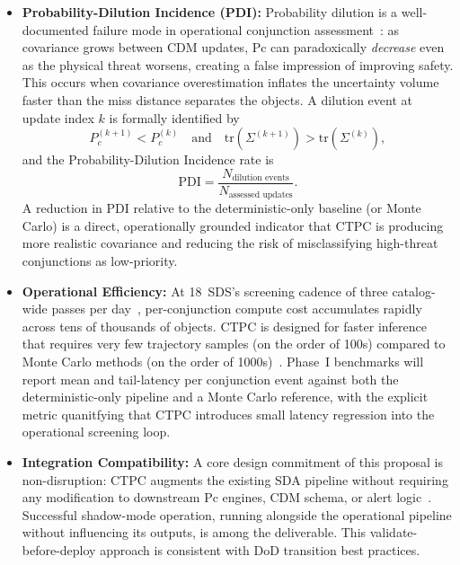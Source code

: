 \documentclass[10pt]{article}
\begin{document}
\begin{itemize}
\item \textbf{Probability-Dilution Incidence (PDI):}\label{itm:pdi}
Probability dilution is a well-documented failure mode in operational conjunction assessment~\cite{nasa_bestpractices}: as covariance grows between CDM updates, Pc can paradoxically \emph{decrease} even as the physical threat worsens, creating a false impression of improving safety. This occurs when covariance overestimation inflates the uncertainty volume faster than the miss distance separates the objects. A dilution event at update index $k$ is formally identified by
\[
P_c^{(k+1)} < P_c^{(k)}
\quad \text{and} \quad
\mathrm{tr}\!\left(\Sigma^{(k+1)}\right) > \mathrm{tr}\!\left(\Sigma^{(k)}\right),
\]
and the Probability-Dilution Incidence rate is
\[
\mathrm{PDI}=\frac{N_{\text{dilution events}}}{N_{\text{assessed updates}}}.
\label{eq:pdi}
\]
A reduction in PDI relative to the deterministic-only baseline (or Monte Carlo) is a direct, operationally grounded indicator that CTPC is producing more realistic covariance and reducing the risk of misclassifying high-threat conjunctions as low-priority.

\item \textbf{Operational Efficiency:}
At 18~SDS's screening cadence of three catalog-wide passes per day~\cite{nasa_cara, ussf_18sds}, per-conjunction compute cost accumulates rapidly across tens of thousands of objects. CTPC is designed for faster inference that requires very few trajectory samples (on the order of 100s) compared to Monte Carlo methods (on the order of 1000s)~\cite{hall2023_pcmultistep}. Phase~I benchmarks will report mean and tail-latency per conjunction event against both the deterministic-only pipeline and a Monte Carlo reference, with the explicit metric quanitfying that CTPC introduces small latency regression into the operational screening loop.

\item \textbf{Integration Compatibility:}
A core design commitment of this proposal is non-disruption: CTPC augments the existing SDA pipeline without requiring any modification to downstream Pc engines, CDM schema, or alert logic~\cite{hall2021_3dnc, ccsds_cdm}. Successful shadow-mode operation, running alongside the operational pipeline without influencing its outputs, is among the deliverable. This validate-before-deploy approach is consistent with DoD transition best practices.

\end{itemize}
\end{document}
